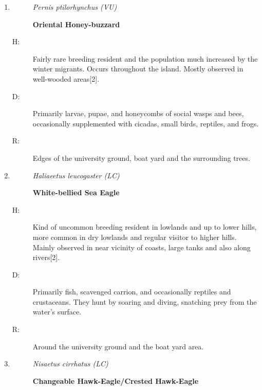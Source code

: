 \begin{itemize}
\begin{enumerate}
%
\item%
\begin{description}%
\item[]%
\textit{Pernis ptilorhynchus (VU)}%
\item[]%
\textbf{Oriental Honey-buzzard}%
\end{description}%
\begin{description}%
\item[H: ]%
Fairly rare breeding resident and the population much increased by the winter migrants. Occurs throughout the island. Mostly observed in well{-}wooded areas{[}2{]}.%
\item[D: ]%
Primarily larvae, pupae, and honeycombs of social wasps and bees, occasionally supplemented with cicadas, small birds, reptiles, and frogs.%
\item[R: ]%
Edges of the university ground, boat yard and the surrounding trees.%
\end{description}%
\item%
\begin{description}%
\item[]%
\textit{Haliaeetus leucogaster (LC)}%
\item[]%
\textbf{White{-}bellied Sea Eagle}%
\end{description}%
\begin{description}%
\item[H: ]%
Kind of uncommon breeding resident in lowlands and up to lower hills, more common in dry lowlands and regular visitor to higher hills. Mainly observed in near vicinity of coasts, large tanks and also along rivers{[}2{]}.%
\item[D: ]%
Primarily fish, scavenged carrion, and occasionally reptiles and crustaceans. They hunt by soaring and diving, snatching prey from the water's surface.%
\item[R: ]%
Around the university ground and the boat yard area.%
\end{description}%
\item%
\begin{description}%
\item[]%
\textit{Nisaetus cirrhatus (LC)}%
\item[]%
\textbf{Changeable Hawk{-}Eagle/Crested Hawk{-}Eagle}%

\end{description}
\end{enumerate}
\end{itemize}
